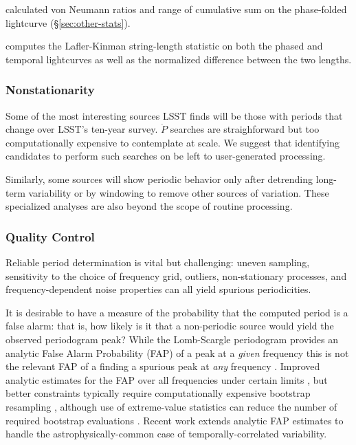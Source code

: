 \documentclass[DM,authoryear,toc]{lsstdoc}
\begin{document}
\citet{Kim:14:The-EPOCH-Proje} calculated von Neumann ratios and range of cumulative sum on the phase-folded lightcurve (\S \ref{sec:other-stats}).

\citet{Jayasinghe:19:ASASSNVarsIII} computes the Lafler-Kinman string-length statistic on both the phased and temporal lightcurves as well as the normalized difference between the two lengths.



\subsubsection{Nonstationarity}

Some of the most interesting sources LSST finds will be those with periods that change over LSST's ten-year survey.
$\dot{P}$ searches are straighforward but too computationally expensive to contemplate at scale.
We suggest that identifying candidates to perform such searches on be left to user-generated processing.

Similarly, some sources will show periodic behavior only after detrending long-term variability or by windowing to remove other sources of variation.
These specialized analyses are also beyond the scope of routine processing.

\subsubsection{Quality Control}

Reliable period determination is vital but challenging: uneven sampling, sensitivity to the choice of frequency grid, outliers, non-stationary processes, and frequency-dependent noise properties can all yield spurious periodicities.

It is desirable to have a measure of the probability that the computed period is a false alarm:  that is, how likely is it that a non-periodic source would yield the observed periodogram peak?
While the Lomb-Scargle periodogram provides an analytic False Alarm Probability (FAP) of a peak at a \textit{given} frequency \citep{Scargle:82:Studies-in-astr} this is not the relevant FAP of a finding a spurious peak at \textit{any} frequency \citep[and references therein]{VanderPlas:18:UnderstandingLS}.
Improved analytic estimates for the FAP over all frequencies under certain limits \citep{Baluev:08:FAP}, but better constraints typically require computationally expensive bootstrap resampling \citep[e.g.,][]{Ivezic:14:MLBook}, although use of extreme-value statistics can reduce the number of required bootstrap evaluations \citep{Suveges:12:FAP}.
Recent work \citep{Delisle:20:LSFAPCorrelatedNoise} extends analytic FAP estimates to handle the astrophysically-common case of temporally-correlated variability.
\end{document}
